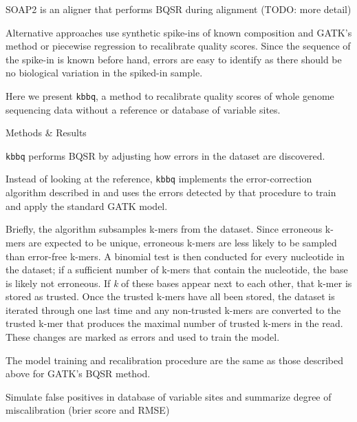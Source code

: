 \documentclass{article}
\begin{document}
\begin{outline}
\begin{outline}
\begin{outline}
			\item SOAP2 \parencite{li_soap2:_2009} is an aligner that performs BQSR during alignment (TODO: more detail)
			\item Alternative approaches use synthetic spike-ins of known composition and GATK's method \parencite{zook_synthetic_2012} or piecewise regression \parencite{ni_improvement_2016} to recalibrate quality scores. Since the sequence of the spike-in is known before hand, errors are easy to identify as there should be no biological variation in the spiked-in sample.
			\end{outline}
		\item Here we present \texttt{kbbq}, a method to recalibrate quality scores of whole genome sequencing data without a reference or database of variable sites.
	\end{outline}
	\item Methods \& Results
	\begin{outline}
		\item \texttt{kbbq} performs BQSR by adjusting how errors in the dataset are discovered.
		\begin{outline}
			\item Instead of looking at the reference, \texttt{kbbq} implements the error-correction algorithm described in \cite{song_lighter_2014} and uses the errors detected by that procedure to train and apply the standard GATK model.
			\item Briefly, the algorithm subsamples k-mers from the dataset. Since erroneous k-mers are expected to be unique, erroneous k-mers are less likely to be sampled than error-free k-mers. A binomial test is then conducted for every nucleotide in the dataset; if a sufficient number of k-mers that contain the nucleotide, the base is likely not erroneous. If \textit{k} of these bases appear next to each other, that k-mer is stored as trusted. Once the trusted k-mers have all been stored, the dataset is iterated through one last time and any non-trusted k-mers are converted to the trusted k-mer that produces the maximal number of trusted k-mers in the read. These changes are marked as errors and used to train the model.
			\item The model training and recalibration procedure are the same as those described above for GATK's BQSR method.
		\end{outline}
		\item Simulate false positives in database of variable sites and summarize degree of miscalibration (brier score and RMSE)

\end{outline}
\end{outline}
\end{document}
